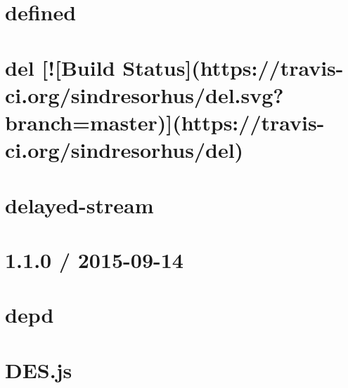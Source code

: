\documentclass[twoside]{book}
\newcommand{\+}{\discretionary{\mbox{\scriptsize$\hookleftarrow$}}{}{}}
\begin{document}
\chapter{defined}
\label{md__c_1_workspace_demo_src_main_script_node_modules_defined_readme}

\chapter{del \mbox{[}!\mbox{[}Build Status\mbox{]}(https\+://travis-\/ci.org/sindresorhus/del.svg?branch=master)\mbox{]}(https\+://travis-\/ci.org/sindresorhus/del)}
\label{md__c_1_workspace_demo_src_main_script_node_modules_del_readme}

\chapter{delayed-\/stream}
\label{md__c_1_workspace_demo_src_main_script_node_modules_delayed-stream__readme}

\chapter{1.1.0 / 2015-\/09-\/14}
\label{md__c_1_workspace_demo_src_main_script_node_modules_depd__history}

\chapter{depd}
\label{md__c_1_workspace_demo_src_main_script_node_modules_depd__readme}

\chapter{D\+E\+S.\+js}
\label{md__c_1_workspace_demo_src_main_script_node_modules_des_8js__r_e_a_d_m_e}

\end{document}
